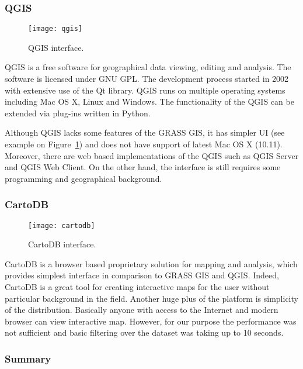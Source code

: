 \subsubsection{QGIS}

\begin{figure}[ht]
  {\par\centering
  \texttt{[image: qgis]}
  \par}
  \caption{QGIS interface.}
  \label{pic:qgis}
\end{figure}

QGIS is a free software for geographical data viewing, editing and analysis. The software is
licensed under GNU GPL. The development process started in 2002 with extensive use of the Qt
library. QGIS runs on multiple operating systems including Mac OS X, Linux and Windows.
The functionality of the QGIS can be extended via plug-ins written in Python.

Although QGIS lacks some features of the GRASS GIS, it has simpler UI (see example on
Figure~\ref{pic:qgis}) and does not have support of latest Mac OS X (10.11). Moreover, there are web
based implementations of the QGIS such as QGIS Server and QGIS Web Client. On the other hand, the
interface is still requires some programming and geographical background.

\subsubsection{CartoDB}

\begin{figure}[ht]
  {\par\centering
  \texttt{[image: cartodb]}
  \par}
  \caption{CartoDB interface.}
  \label{pic:cartodb}
\end{figure}

CartoDB is a browser based proprietary solution for mapping and analysis, which provides simplest
interface in comparison to GRASS GIS and QGIS. Indeed, CartoDB is a great tool for creating
interactive maps for the user without particular background in the field. Another huge plus of the
platform is simplicity of the distribution. Basically anyone with access to the Internet and modern
browser can view interactive map. However, for our purpose the performance was not sufficient and
basic filtering over the dataset was taking up to 10 seconds.

\subsubsection{Summary}

